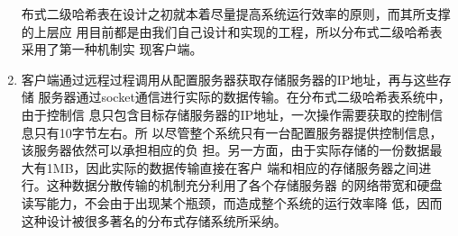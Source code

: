 \begin{enumerate}
  布式二级哈希表在设计之初就本着尽量提高系统运行效率的原则，而其所支撑的上层应
  用目前都是由我们自己设计和实现的工程，所以分布式二级哈希表采用了第一种机制实
  现客户端。
  \item 客户端通过远程过程调用从配置服务器获取存储服务器的IP地址，再与这些存储
  服务器通过socket通信进行实际的数据传输。在分布式二级哈希表系统中，由于控制信
  息只包含目标存储服务器的IP地址，一次操作需要获取的控制信息只有10字节左右。所
  以尽管整个系统只有一台配置服务器提供控制信息，该服务器依然可以承担相应的负
  担。另一方面，由于实际存储的一份数据最大有1MB，因此实际的数据传输直接在客户
  端和相应的存储服务器之间进行。这种数据分散传输的机制充分利用了各个存储服务器
  的网络带宽和硬盘读写能力，不会由于出现某个瓶颈，而造成整个系统的运行效率降
  低，因而这种设计被很多著名的分布式存储系统所采纳。\cite{ghemawat2003google}
\end{enumerate}
